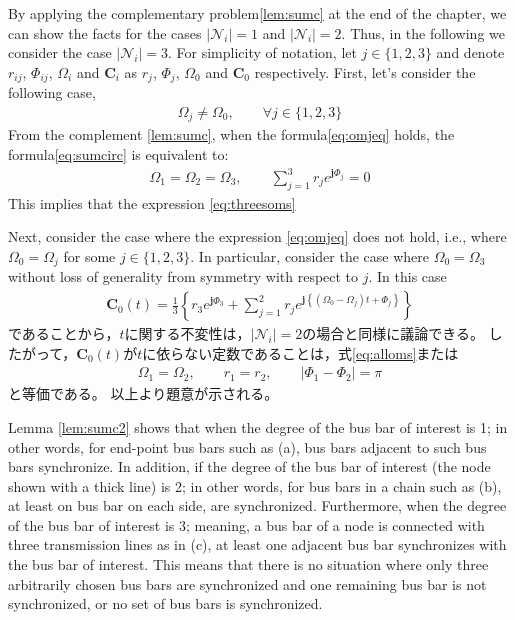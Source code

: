 \documentclass[tombow,dvipdfmx]{corona-a5-1.1}
\begin{document}
\begin{証明}
By applying the complementary problem\ref{lem:sumc} at the end of the chapter, we can show the facts for the cases $|\mathcal{N}_i|=1$ and $|\mathcal{N}_i|=2$.
Thus, in the following we consider the case $|\mathcal{N}_i|=3$.
For simplicity of notation, let $j \in\{1,2,3\}$ and denote $r_{ij}$, $\Phi_{ij}$, $\Omega_i$ and $\bm{C}_i$ as $r_{j}$, $\Phi_{j}$, $\Omega_0$ and $\bm{C}_0$ respectively.
First, let's consider the following case,
\begin{align}\label{eq:omjeq}
\Omega_j \neq \Omega_0
,\qquad \forall j \in \{1,2,3\}
\end{align}
From the complement \ref{lem:sumc}, when the formula\ref{eq:omjeq} holds, the formula\ref{eq:sumcirc} is equivalent to:
\begin{align*}
\Omega_1 = \Omega_2 = \Omega_3,\qquad
\sum_{j=1}^3 
r_j e^{\bm{j} \Phi_j}=0
\end{align*}
This implies that the expression \ref{eq:threesoms}

Next, consider the case where the expression \ref{eq:omjeq} does not hold, i.e., where $\Omega_0=\Omega_j$ for some $j\in\{1,2,3\}$.
In particular, consider the case where $\Omega_0=\Omega_3$ without loss of generality from symmetry with respect to $j$.
In this case
\begin{align*}
\bm{C}_0 (t) = \frac{1}{3} \left\{
r_3 e^{\bm{j} \Phi_3}
+
\sum_{j=1}^2
r_{j}
e^{\bm{j} 
\left\{
(\Omega_0 - \Omega_j)t + 
\Phi_{j}
\right\} }
\right\}
\end{align*}
であることから，$t$に関する不変性は，$|\mathcal{N}_i|=2$の場合と同様に議論できる。
したがって，$\bm{C}_0 (t)$が$t$に依らない定数であることは，式\ref{eq:alloms}または
\begin{align*}
\Omega_{1} = \Omega_{2}
,\qquad
r_{1} = r_{2}
,\qquad
|\Phi_{1}-\Phi_{2}| = \pi
\end{align*}
と等価である。
以上より題意が示される。
\end{証明}

Lemma \ref{lem:sumc2} shows that when the degree of the bus bar of interest is 1; in other words, for end-point bus bars such as (a), bus bars adjacent to such bus bars synchronize.
In addition, if the degree of the bus bar of interest (the node shown with a thick line) is 2; in other words, for bus bars in a chain such as (b), at least on bus bar on each side, are synchronized.
Furthermore, when the degree of the bus bar of interest is 3; meaning, a bus bar of a node is connected with three transmission lines as in (c), at least one adjacent bus bar synchronizes with the bus bar of interest.
This means that there is no situation where only three arbitrarily chosen bus bars are synchronized and one remaining bus bar is not synchronized, or no set of bus bars is synchronized.
\end{document}
